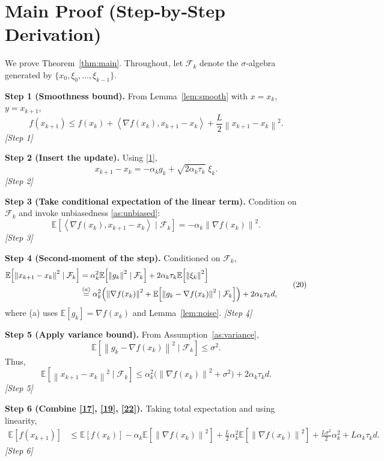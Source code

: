 \documentclass{article}
\newcommand{\E}{\mathbb{E}}
\newcommand{\norm}[1]{\left\|#1\right\|}
\newcommand{\inner}[2]{\left\langle #1,#2 \right\rangle}
\begin{document}
\newpage
\section*{Main Proof (Step‑by‑Step Derivation)}
We prove Theorem~\ref{thm:main}. Throughout, let $\mathcal F_{k}$ denote the $\sigma$‑algebra generated by $\{x_{0},\xi_{0},\dots,\xi_{k-1}\}$.

\noindent\textbf{Step 1 (Smoothness bound).}  
From Lemma~\ref{lem:smooth} with $x=x_{k}$, $y=x_{k+1}$,
\[
f(x_{k+1})\le f(x_{k})+\inner{\nabla f(x_{k})}{x_{k+1}-x_{k}}+\frac{L}{2}\norm{x_{k+1}-x_{k}}^{2}.
\tag{17}
\]
\textit{[Step 1]}

\noindent\textbf{Step 2 (Insert the update).}  
Using \eqref{1},
\[
x_{k+1}-x_{k}= -\alpha_{k}g_{k}+ \sqrt{2\alpha_{k}\tau_{k}}\;\xi_{k}.
\tag{18}
\]
\textit{[Step 2]}

\noindent\textbf{Step 3 (Take conditional expectation of the linear term).}  
Condition on $\mathcal F_{k}$ and invoke unbiasedness \eqref{as:unbiased}:
\[
\E\!\left[\inner{\nabla f(x_{k})}{x_{k+1}-x_{k}}\mid\mathcal F_{k}\right]
= -\alpha_{k}\norm{\nabla f(x_{k})}^{2}.
\tag{19}
\]
\textit{[Step 3]}

\noindent\textbf{Step 4 (Second‑moment of the step).}  
Conditioned on $\mathcal F_{k}$,
\[
\begin{aligned}
\E\!\left[\norm{x_{k+1}-x_{k}}^{2}\mid\mathcal F_{k}\right]
&= \alpha_{k}^{2}\E\!\left[\norm{g_{k}}^{2}\mid\mathcal F_{k}\right]
+2\alpha_{k}\tau_{k}\E\!\left[\norm{\xi_{k}}^{2}\right] \\
&\overset{(a)}{=}\alpha_{k}^{2}\Bigl(\norm{\nabla f(x_{k})}^{2}
+\E\!\left[\norm{g_{k}-\nabla f(x_{k})}^{2}\mid\mathcal F_{k}\right]\Bigr)
+2\alpha_{k}\tau_{k}d,
\end{aligned}
\tag{20}
\]
where (a) uses $\E[g_{k}]=\nabla f(x_{k})$ and Lemma~\ref{lem:noise}.  
\textit{[Step 4]}

\noindent\textbf{Step 5 (Apply variance bound).}  
From Assumption~\ref{as:variance},
\[
\E\!\left[\norm{g_{k}-\nabla f(x_{k})}^{2}\mid\mathcal F_{k}\right]\le\sigma^{2}.
\tag{21}
\]
Thus,
\[
\E\!\left[\norm{x_{k+1}-x_{k}}^{2}\mid\mathcal F_{k}\right]
\le \alpha_{k}^{2}\bigl(\norm{\nabla f(x_{k})}^{2}+\sigma^{2}\bigr)
+2\alpha_{k}\tau_{k}d .
\tag{22}
\]
\textit{[Step 5]}

\noindent\textbf{Step 6 (Combine \eqref{17}, \eqref{19}, \eqref{22}).}  
Taking total expectation and using linearity,
\[
\begin{aligned}
\E[f(x_{k+1})]
&\le \E[f(x_{k})]
-\alpha_{k}\E\!\left[\norm{\nabla f(x_{k})}^{2}\right]
+\frac{L}{2}\alpha_{k}^{2}\E\!\left[\norm{\nabla f(x_{k})}^{2}\right]
+\frac{L\sigma^{2}}{2}\alpha_{k}^{2}
+L\alpha_{k}\tau_{k}d .
\end{aligned}
\tag{23}
\]
\textit{[Step 6]}
\end{document}
